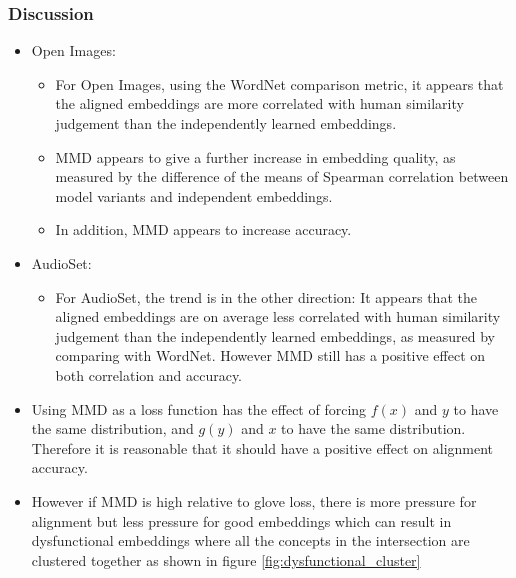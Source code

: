 \subsubsection{Discussion}
\begin{itemize}
    \item Open Images:
    \begin{itemize}
        \item For Open Images, using the WordNet comparison metric, it appears that the aligned embeddings are more correlated with human similarity judgement than the independently learned embeddings. 
        \item MMD appears to give a further increase in embedding quality, as measured by the difference of the means of Spearman correlation between model variants and independent embeddings.
        \item In addition, MMD appears to increase accuracy. 
    \end{itemize}
    \item AudioSet:
    \begin{itemize}
        \item For AudioSet, the trend is in the other direction: It appears that the aligned embeddings are on average less correlated with human similarity judgement than the independently learned embeddings, as measured by comparing with WordNet. However MMD still has a positive effect on both correlation and accuracy. 
    \end{itemize}
    \item Using MMD as a loss function has the effect of forcing $f(x)$ and $y$ to have the same distribution, and  $g(y)$ and $x$ to have the same distribution. Therefore it is reasonable that it should have a positive effect on alignment accuracy. 
    \item However if MMD is high relative to glove loss, there is more pressure for alignment but less pressure for good embeddings which can result in dysfunctional embeddings where all the concepts in the intersection are clustered together as shown in figure \ref{fig:dysfunctional_cluster}
\end{itemize}

